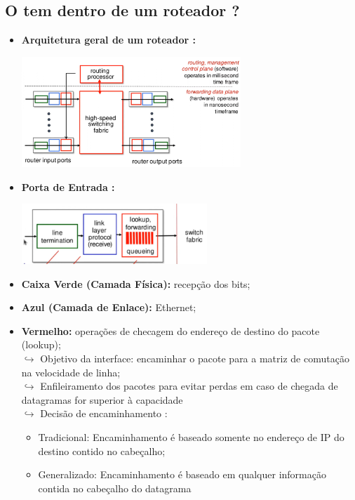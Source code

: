     \subsection{O tem dentro de um roteador ?}
        
        \begin{itemize}[left=0.5cm, align=left, nosep]
            \item \textbf{Arquitetura geral de um roteador :}
        
            \begin{center}
                \includegraphics[width=0.65\textwidth]{img/cap-04/arquitetura-geral-roteador.png}
            \end{center}

            \item \textbf{Porta de Entrada :}
            
            \begin{center}
                \includegraphics[width=0.55\textwidth]{img/cap-04/porta-de-entrada.png}
            \end{center}
            
            \item \textbf{Caixa Verde (Camada Física):} recepção dos bits;
            \item \textbf{Azul (Camada de Enlace):} Ethernet;
            \item \textbf{Vermelho:} operações de checagem do endereço de destino do pacote (lookup); \\
                $\hookrightarrow$ Objetivo da interface: encaminhar o pacote para a matriz de comutação na velocidade de linha; \\
                $\hookrightarrow$ Enfileiramento dos pacotes para evitar perdas em caso de chegada de datagramas for superior à capacidade \\
                $\hookrightarrow$ Decisão de encaminhamento :
                \begin{itemize}
                    \item Tradicional: Encaminhamento é baseado somente no endereço de IP do destino contido no cabeçalho;
                    \item Generalizado: Encaminhamento é baseado em qualquer informação contida no cabeçalho do datagrama
                \end{itemize}
            
        \end{itemize}

